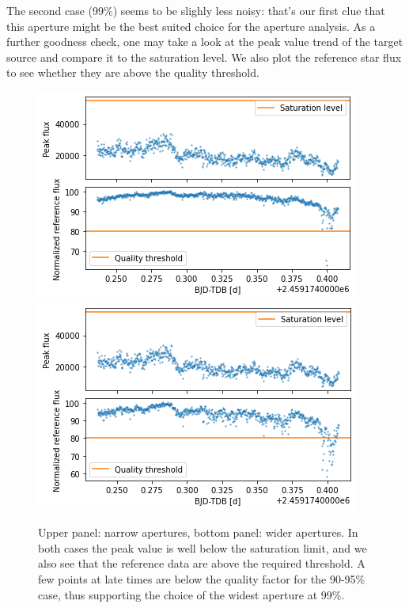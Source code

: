 \documentclass[a4paper,11pt,twocolumn]{article}
\begin{document}
The second case (99\%) seems to be slighly less noisy: that's our first clue 
that this aperture might be the best suited choice for the aperture analysis.
As a further goodness check, one may take a look at the peak value trend of 
the target source and compare it to the saturation level. We also plot the 
reference star flux to see whether they are above the quality threshold.
\begin{figure}
    \centering  
    \includegraphics[scale=0.5, angle=0]{../pictures/taste/saturation-quality.png}
    \includegraphics[scale=0.5, angle=0]{../pictures/taste/saturation-quality2.png}
    \caption{Upper panel: narrow apertures, bottom panel: wider apertures.
    In both cases the peak value is well below the saturation limit, and 
    we also see that the reference data are above the required threshold. 
    A few points at late times are below the quality factor for the 90-95\% 
    case, thus supporting the choice of the widest aperture at 99\%.}
    \label{fig:saturation-quality}
\end{figure}
\end{document}
